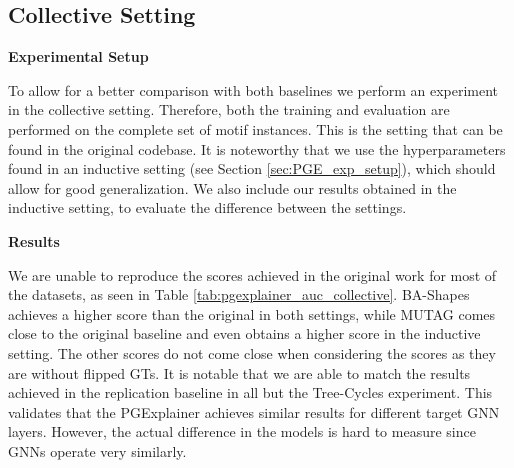 

\subsection{Collective Setting}
\label{sec:coll_exp}

\textbf{Experimental Setup} \par
To allow for a better comparison with both baselines we perform an experiment in the collective setting. Therefore, both the training and evaluation are performed on the complete set of motif instances. This is the setting that can be found in the original codebase. It is noteworthy that we use the hyperparameters found in an inductive setting (see Section \ref{sec:PGE_exp_setup}), which should allow for good generalization. We also include our results obtained in the inductive setting, to evaluate the difference between the settings. \bigskip

\textbf{Results}\par

We are unable to reproduce the scores achieved in the original work for most of the datasets, as seen in Table \ref{tab:pgexplainer_auc_collective}. BA-Shapes achieves a higher score than the original in both settings, while MUTAG comes close to the original baseline and even obtains a higher score in the inductive setting. The other scores do not come close when considering the scores as they are without flipped \acp{GT}. It is notable that we are able to match the results achieved in the replication baseline in all but the Tree-Cycles experiment. This validates that the PGExplainer achieves similar results for different target GNN layers. However, the actual difference in the models is hard to measure since GNNs operate very similarly.

